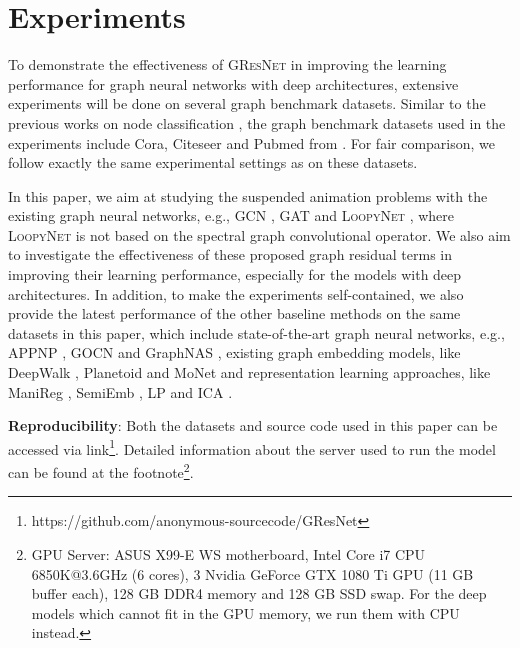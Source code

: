 \documentclass{article}
\newcommand{\gresnet}{\textsc{GResNet}}
\newcommand{\gcn}{\textsc{GCN}}
\newcommand{\gat}{\textsc{GAT}}
\newcommand{\loopy}{\textsc{LoopyNet}}
\begin{document}
\vspace{-8pt}
\section{Experiments}\label{sec:experiment}
\vspace{-8pt}

To demonstrate the effectiveness of {\gresnet} in improving the learning performance for graph neural networks with deep architectures, extensive experiments will be done on several graph benchmark datasets. Similar to the previous works on node classification \cite{KW16, PGAAPY18}, the graph benchmark datasets used in the experiments include Cora, Citeseer and Pubmed from \cite{SNBGGE08}. For fair comparison, we follow exactly the same experimental settings as \cite{KW16} on these datasets.

In this paper, we aim at studying the suspended animation problems with the existing graph neural networks, e.g., {\gcn} \cite{KW16}, {\gat} \cite{PGAAPY18} and {\loopy} \cite{loopynet}, where {\loopy} is not based on the spectral graph convolutional operator. We also aim to investigate the effectiveness of these proposed graph residual terms in improving their learning performance, especially for the models with deep architectures. In addition, to make the experiments self-contained, we also provide the latest performance of the other baseline methods on the same datasets in this paper, which include state-of-the-art graph neural networks, e.g., APPNP \cite{KBG19}, GOCN \cite{JZTL19} and GraphNAS \cite{GYZZH19}, existing graph embedding models, like DeepWalk \cite{PAS14}, Planetoid \cite{YCS16} and MoNet \cite{MBMRSB16} and representation learning approaches, like ManiReg \cite{BNS06}, SemiEmb \cite{WRC08}, LP \cite{ZGL03} and ICA \cite{LG03}. 

\noindent \textbf{Reproducibility}: Both the datasets and source code used in this paper can be accessed via link\footnote{https://github.com/anonymous-sourcecode/GResNet}. Detailed information about the server used to run the model can be found at the footnote\footnote{GPU Server: ASUS X99-E WS motherboard, Intel Core i7 CPU 6850K@3.6GHz (6 cores), 3 Nvidia GeForce GTX 1080 Ti GPU (11 GB buffer each), 128 GB DDR4 memory and 128 GB SSD swap. For the deep models which cannot fit in the GPU memory, we run them with CPU instead.}.
\end{document}
